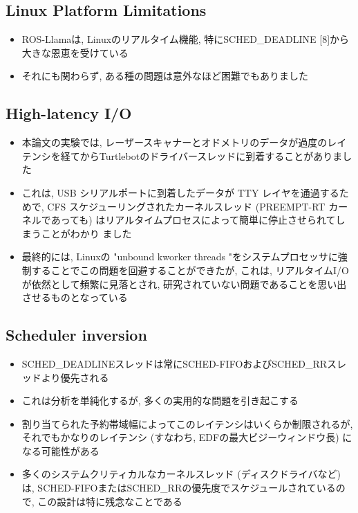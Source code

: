 \subsection{Linux Platform Limitations}
\label{ssec: linux platform limitations}

\begin{frame}{}
    \begin{itemize}
        \item ROS-Llamaは, Linuxのリアルタイム機能, 特にSCHED\_DEADLINE [8]から大きな恩恵を受けている
        \item それにも関わらず, ある種の問題は意外なほど困難でもありました
    \end{itemize}
\end{frame}


\subsection{High-latency I/O}
\label{ssec: high-latency i/o}

\begin{frame}{}
    \begin{itemize}
        \item 本論文の実験では, レーザースキャナーとオドメトリのデータが過度のレイテンシを経てからTurtlebotのドライバースレッドに到着することがありました
        \item これは, USB シリアルポートに到着したデータが TTY レイヤを通過するためで, CFS スケジューリングされたカーネルスレッド (PREEMPT-RT カーネルであっても) はリアルタイムプロセスによって簡単に停止させられてしまうことがわかり ました
        \item 最終的には, Linuxの "unbound kworker threads "をシステムプロセッサに強制することでこの問題を回避することができたが, これは, リアルタイムI/Oが依然として頻繁に見落とされ, 研究されていない問題であることを思い出させるものとなっている
    \end{itemize}
\end{frame}


\subsection{Scheduler inversion}
\label{ssec: scheduler inversion}

\begin{frame}{}
    \begin{itemize}
        \item SCHED\_DEADLINEスレッドは常にSCHED-FIFOおよびSCHED\_RRスレッドより優先される
        \item これは分析を単純化するが, 多くの実用的な問題を引き起こする
        \item 割り当てられた予約帯域幅によってこのレイテンシはいくらか制限されるが, それでもかなりのレイテンシ (すなわち, EDFの最大ビジーウィンドウ長) になる可能性がある
        \item 多くのシステムクリティカルなカーネルスレッド (ディスクドライバなど) は, SCHED-FIFOまたはSCHED\_RRの優先度でスケジュールされているので, この設計は特に残念なことである
    \end{itemize}
\end{frame}

